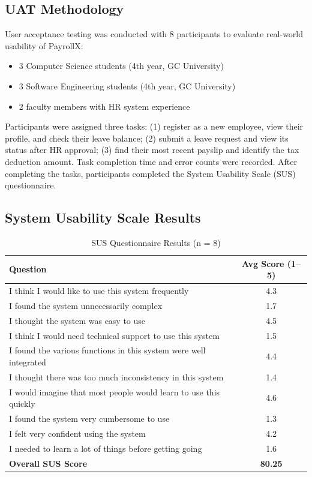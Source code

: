 \documentclass[12pt,a4paper]{report}
\begin{document}
\subsection{UAT Methodology}

User acceptance testing was conducted with 8 participants to evaluate real-world usability of PayrollX:
\begin{itemize}
    \item 3 Computer Science students (4th year, GC University)
    \item 3 Software Engineering students (4th year, GC University)
    \item 2 faculty members with HR system experience
\end{itemize}

Participants were assigned three tasks: (1) register as a new employee, view their profile, and check their leave balance; (2) submit a leave request and view its status after HR approval; (3) find their most recent payslip and identify the tax deduction amount. Task completion time and error counts were recorded. After completing the tasks, participants completed the System Usability Scale (SUS) questionnaire.

\subsection{System Usability Scale Results}

\begin{table}[H]
\centering
\caption{SUS Questionnaire Results (n = 8)}
\label{tab:sus_results}
\begin{tabular}{|p{8.5cm}|c|}
\hline
\textbf{Question} & \textbf{Avg Score (1--5)} \\
\hline
I think I would like to use this system frequently & 4.3 \\
\hline
I found the system unnecessarily complex & 1.7 \\
\hline
I thought the system was easy to use & 4.5 \\
\hline
I think I would need technical support to use this system & 1.5 \\
\hline
I found the various functions in this system were well integrated & 4.4 \\
\hline
I thought there was too much inconsistency in this system & 1.4 \\
\hline
I would imagine that most people would learn to use this quickly & 4.6 \\
\hline
I found the system very cumbersome to use & 1.3 \\
\hline
I felt very confident using the system & 4.2 \\
\hline
I needed to learn a lot of things before getting going & 1.6 \\
\hline
\textbf{Overall SUS Score} & \textbf{80.25} \\
\hline
\end{tabular}
\end{table}
\end{document}
